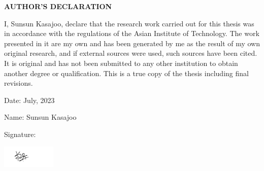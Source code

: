 \begin{center}
    \large{\bf AUTHOR'S DECLARATION}
\end{center}

I, Sunsun Kasajoo, declare that the research work carried out for this thesis was in accordance with the regulations of the Asian Institute of Technology. The work presented in it are my own and has been generated by me as the result of my own original research, and if external sources were used, such sources have been cited. It is original and has not been submitted to any other institution to obtain another degree or qualification. This is a true copy of the thesis including final revisions.

Date: July, 2023

Name: Sunsun Kasajoo


Signature: 

\vspace{-3em}\hspace{5.5em}\includegraphics[height=30pt]{figures/signature.png}
